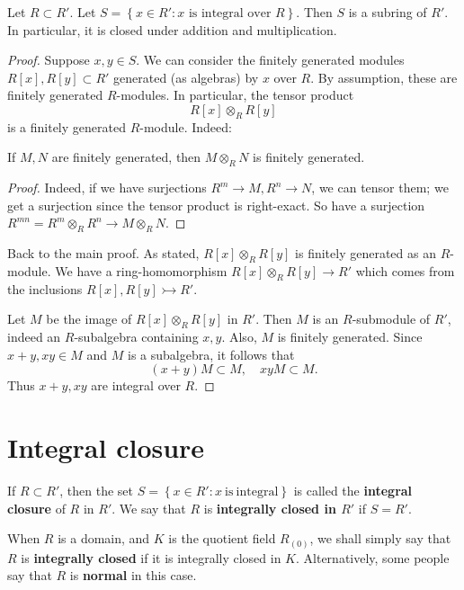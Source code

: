 \begin{theorem} 
Let $R \subset R'$. Let $S = \left\{x \in R': x \text{ is integral over }
R\right\}$. Then $S$ is a subring of $R'$. In particular, it is closed under
addition and multiplication. 
\end{theorem} 
\begin{proof} 
Suppose $x,y \in S$.  
We can consider the finitely generated modules $R[x], R[y] \subset R'$
generated (as algebras) by $x$ over $R$. By assumption, these are finitely
generated $R$-modules. In particular, the tensor product
\[ R[x] \otimes_R R[y]  \]
is a finitely generated $R$-module. 
Indeed:
\begin{lemma} 
If $M, N$ are finitely generated, then $M \otimes_R N$ is finitely generated.  
\end{lemma} 
\begin{proof} 
Indeed, if we have surjections $R^m \to M, R^n \to N$, we can tensor them; we
get a surjection since the tensor product is right-exact.
So have a surjection
$R^{m n} = R^m \otimes_R R^n \to M \otimes_R N$. 
\end{proof} 

Back to the main proof. As stated, $R[x] \otimes_R R[y]$ is finitely generated
as an $R$-module. We have a ring-homomorphism $R[x]\otimes_R R[y] \to R'$
which comes from the inclusions $R[x], R[y] \rightarrowtail R'$.

Let $M$ be the image of $R[x] \otimes_R R[y]$ in $R'$. Then $M$ is an
$R$-submodule of $R'$, indeed an $R$-subalgebra containing $x,y$.  Also, $M$ is
finitely generated. Since $x+y, xy\in M$ and $M$ is a subalgebra, it follows that
\[ (x+y) M \subset M, \quad xy M \subset M.  \]
Thus $x+y, xy$ are integral over $R$.
\end{proof} 

\section{Integral closure}
\begin{definition} 
If $R \subset R'$, then the set $S = \left\{x \in R': x \ \mathrm{is \
integral  }\right\}$ is called the \textbf{integral closure} of $R$ in $R'$. We
say that $R$ is \textbf{integrally closed in $R'$} if $S = R'$. 


When $R$ is a domain, and $K$ is the quotient field $R_{(0)}$, we shall simply
say that $R$ is \textbf{integrally closed} if it is integrally closed in
$K$.
Alternatively, some people say that $R$ is \textbf{normal} in this case.
\end{definition} 


